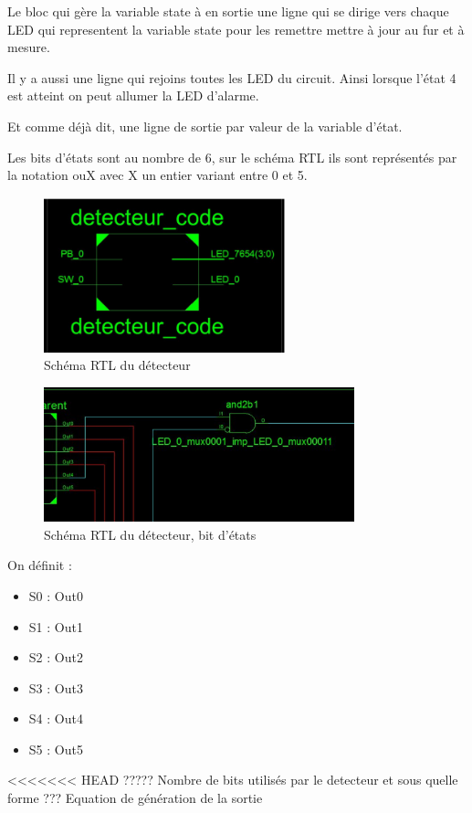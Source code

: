 \documentclass[11pt]{report}
\begin{document}
Le bloc qui gère la variable state à en sortie une ligne qui se dirige vers chaque LED qui representent la variable state pour les remettre mettre à jour au fur et à mesure.

Il y a aussi une ligne qui rejoins toutes les LED du circuit. Ainsi lorsque l'état 4 est atteint on peut allumer la LED d'alarme.

Et comme déjà dit, une ligne de sortie par valeur de la variable d'état.

Les bits d'états sont au nombre de 6, sur le schéma RTL ils sont représentés par la notation ouX avec X un entier variant entre 0 et 5.

  
\begin{figure}[!h]
\includegraphics[width=7cm]{TP02-12.png}
\caption{Schéma RTL du détecteur}
\end{figure}


\begin{figure}[!h]
\includegraphics[width=9cm]{TP02-11.png}
\caption{Schéma RTL du détecteur, bit d'états}
\end{figure}
  
  
  On définit : 
  \begin{itemize}
	\item S0 : Out0
	\item S1 : Out1
		\item S2 : Out2
		\item S3 : Out3
		\item S4 : Out4
		\item S5 : Out5

\end{itemize}

<<<<<<< HEAD
  ????? Nombre de bits utilisés par le detecteur et sous quelle forme
  ??? Equation de génération de la sortie
\end{document}
